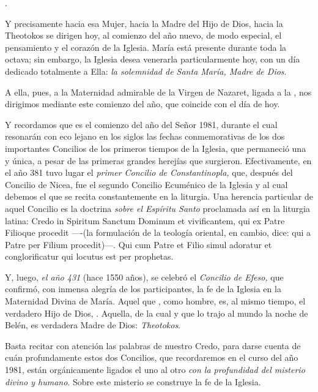 \begin{body}
	.
	
	Y precisamente hacia esa Mujer, hacia la Madre del Hijo de Dios, hacia la Theotokos se dirigen hoy, al comienzo del año nuevo, de modo especial, el pensamiento y el corazón de la Iglesia. María está presente durante toda la octava; sin embargo, la Iglesia desea venerarla particularmente hoy, con un día dedicado totalmente a Ella: \emph{la solemnidad de Santa María, Madre de Dios}.
	
	A ella, pues, a la Maternidad admirable de la Virgen de Nazaret, ligada a la , nos dirigimos mediante este comienzo del año, que coincide con el día de hoy.
	
	Y recordamos que es el comienzo del año del Señor 1981, durante el cual resonarán con eco lejano en los siglos las fechas conmemorativas de los dos importantes Concilios de los primeros tiempos de la Iglesia, que permaneció una y única, a pesar de las primeras grandes herejías que surgieron. Efectivamente, en el año 381 tuvo lugar el \emph{primer Concilio de Constantinopla,} que, después del Concilio de Nicea, fue el segundo Concilio Ecuménico de la Iglesia y al cual debemos el  que se recita constantemente en la liturgia. Una herencia particular de aquel Concilio es la doctrina \emph{sobre el Espíritu Santo} proclamada así en la liturgia latina: Credo in Spiritum Sanctum Dominum et vivificantem, qui ex Patre Filioque procedit ----(la formulación de la teología oriental, en cambio, dice: qui a Patre per Filium procedit)---. Qui cum Patre et Filio simul adoratur et conglorificatur qui locutus est per prophetas.
	
	Y, luego, \emph{el año 431} (hace 1550 años), se celebró el \emph{Concilio de Efeso,} que confirmó, con inmensa alegría de los participantes, la fe de la Iglesia en la Maternidad Divina de María. Aquel que , como hombre, es, al mismo tiempo, el verdadero Hijo de Dios, . Aquella, de la cual  y que lo trajo al mundo la noche de Belén, es verdadera Madre de Dios: \emph{Theotokos}.
	
	Basta recitar con atención las palabras de nuestro Credo, para darse cuenta de cuán profundamente estos dos Concilios, que recordaremos en el curso del año 1981, están orgánicamente ligados el uno al otro \emph{con la profundidad del misterio divino y humano}. Sobre este misterio se construye la fe de la Iglesia.
	

\end{body}
